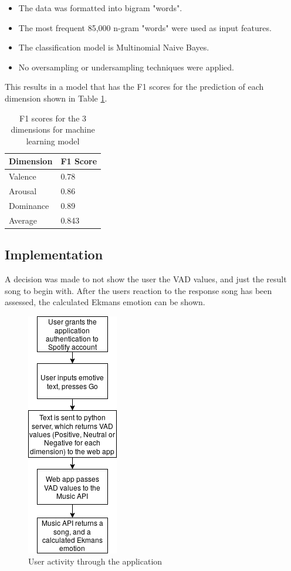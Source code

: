 \begin{itemize}
    \item The data was formatted into bigram "words".
    \item The most frequent 85,000 n-gram "words" were used as input features.
    \item The classification model is Multinomial Naive Bayes.
    \item No oversampling or undersampling techniques were applied.
\end{itemize}

This results in a model that has the F1 scores for the prediction of each dimension shown in Table \ref{ML:f1}.

\begin{table}
\centering
\caption{F1 scores for the 3 dimensions for machine learning model}
\begin{tabular}{ |p{3cm}|p{3cm}|}
 \hline
  Dimension & F1 Score \\
 \hline
  Valence & 0.78\\
  Arousal & 0.86 \\
  Dominance & 0.89\\
 \hline
 Average & 0.843\\
 \hline
\end{tabular}
\label{ML:f1}
\end{table}

\subsection{Implementation}

A decision was made to not show the user the VAD values, and just the result song to begin with. After the users reaction to the response song has been assessed, the calculated Ekmans emotion can be shown.

\begin{figure}[ht]
\centering
\includegraphics[scale=0.6]{litImgs/interfaceFlow.png}
\caption{User activity through the application}
\label{implementationFlow}
\end{figure}

